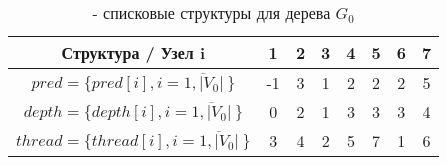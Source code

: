 \documentclass[a4paper,14pt,usenames,dvipsnames]{extreport}
\begin{document}
\begin{table}[H]
\renewcommand{\arraystretch}{1.3}
\caption{- списковые структуры для дерева $G_0$ }
\label{tab:u3}
\begin{center}
\begin{tabular}{|c|c|c|c|c|c|c|c|}
\hline 
Структура / Узел i & 1 & 2 & 3 & 4 & 5 & 6 & 7\\
\hline $pred = \{pred[i], i=\overline{1,|V_0|}\ \}$ & -1 & 3 & 1 & 2 & 2 & 2 & 5\\
\hline $depth = \{depth[i], i=\overline{1,|V_0|}\ \}$ & 0 & 2 & 1 & 3 & 3 & 3 & 4\\
\hline $thread = \{thread[i], i=\overline{1,|V_0|}\ \}$ & 3 & 4 & 2 & 5 & 7 & 1 & 6\\
\hline
\end{tabular}
\end{center}
\end{table}
\end{document}
